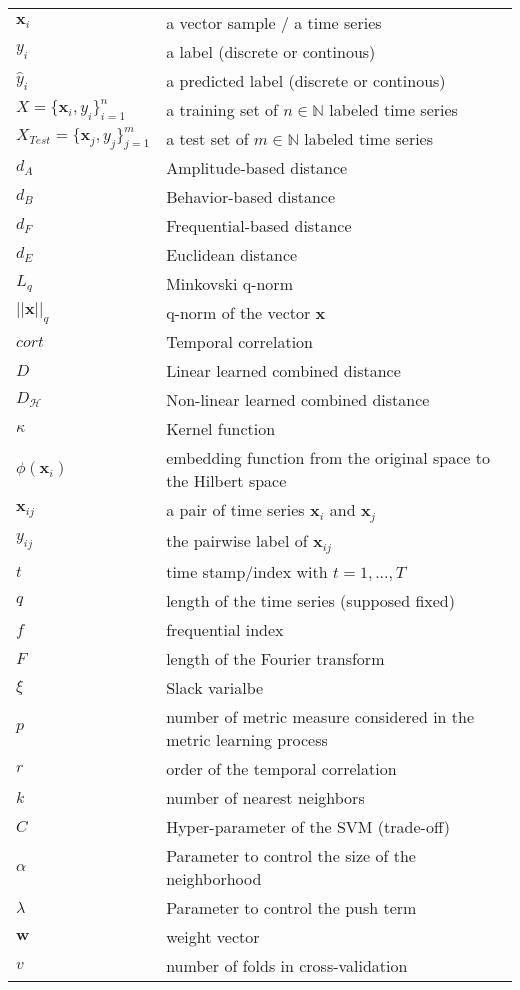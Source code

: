 \begin{tabular}{ll}
	$\textbf{x}_i$ 							& a vector sample / a time series \\ 
	$y_i$ 									& a label (discrete or continous) \\
	$\hat{y}_i$ 							& a predicted label (discrete or continous) \\
	$X = \{\textbf{x}_i , y_i\}_{i=1}^n$ & a training set of $n \in \mathbb{N}$ labeled time series\\
	$X_{Test}=\{\textbf{x}_j,y_j\}_{j=1}^m$ & a test set of $m \in \mathbb{N}$ labeled time series\\
	$d_A$		& Amplitude-based distance \\
	$d_B$		& Behavior-based distance \\
	$d_F$		& Frequential-based distance \\
	$d_E$		& Euclidean distance \\
	$L_q$		& Minkovski q-norm \\
	$||\textbf{x}||_q$	& q-norm of the vector $\textbf{x}$ \\
	$cort$  	& Temporal correlation \\
	$D$ 		& Linear learned combined distance \\
	$D_\mathcal{H}$ 		& Non-linear learned combined distance \\
	$\kappa$	& Kernel function \\
	$\phi(\textbf{x}_i)$ & embedding function from the original space to the Hilbert space  \\	
	$\textbf{x}_{ij}$ 	& a pair of time series $\textbf{x}_i$ and $\textbf{x}_j$ \\
	$y_{ij}$			& the pairwise label of $\textbf{x}_{ij}$ \\
	$t$			& time stamp/index with $t=1,...,T$ \\
	$q$			& length of the time series (supposed fixed) \\
	$f$			& frequential index \\	
	$F$			& length of the Fourier transform \\
	$\xi$		& Slack varialbe \\
	$p$			& number of metric measure considered in the metric learning 	process \\
	$r$			& order of the temporal correlation \\
	$k$			& number of nearest neighbors \\
	$C$ 		& Hyper-parameter of the SVM (trade-off)\\ 
	$\alpha$	& Parameter to control the size of the neighborhood\\
	$\lambda$	& Parameter to control the push term\\
	$\textbf{w}$ & weight vector \\
	$v$			& number of folds in cross-validation

\end{tabular} 




